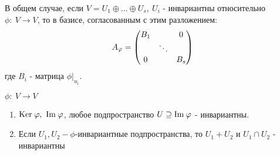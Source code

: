    \begin{remark}
        В общем случае, если $V = U_1 \oplus ... \oplus U_s, \ U_i$ - инвариантны относительно $\phi: \ V \to V$, то в базисе, согласованным с этим разложением:
        $$A_\phi = \begin{pmatrix}
            B_1 & \null & 0\\
            \null & \ddots & \null \\
            0 & \null & B_s
        \end{pmatrix}$$   
        где $B_i$ - матрица $\phi|_{u_i}$.
    \end{remark}
    \begin{example} $\phi: \ V \to V$ 
        \begin{enumerate}
            \item $\text{Ker} \hspace{0.09cm} \phi, \ \text{Im} \hspace{0.09cm} \phi$, любое подпространство $U \supseteq \text{Im} \hspace{0.09cm} \phi$ - инвариантны.
            \item Если $U_1, U_2 - \phi$-инвариантные подпространства, то $U_1 + U_2$ и $U_1 \cap U_2$ - инвариантны   
        \end{enumerate}
    \end{example}
